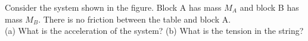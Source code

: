Consider the system shown in the figure. Block A has mass $M_A$
and block B has mass $M_B$. There is no friction between the table
and block A.\\
%
(a) What is the acceleration of the system?\answercheck\hwendpart
%
(b) What is the tension in the string?\answercheck
